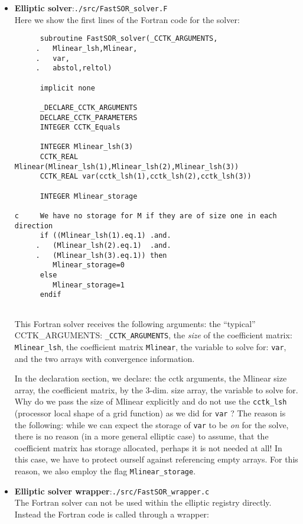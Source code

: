 \documentclass{article}
\begin{document}
\begin{itemize}
\item{\bf Elliptic solver}:{\tt ./src/FastSOR\_solver.F}\\
Here we show the first lines of the Fortran code for the solver:

\begin{verbatim}
      subroutine FastSOR_solver(_CCTK_ARGUMENTS,
     .   Mlinear_lsh,Mlinear, 
     .   var,
     .   abstol,reltol)

      implicit none

      _DECLARE_CCTK_ARGUMENTS
      DECLARE_CCTK_PARAMETERS
      INTEGER CCTK_Equals

      INTEGER Mlinear_lsh(3)
      CCTK_REAL Mlinear(Mlinear_lsh(1),Mlinear_lsh(2),Mlinear_lsh(3))
      CCTK_REAL var(cctk_lsh(1),cctk_lsh(2),cctk_lsh(3))
	
      INTEGER Mlinear_storage

c     We have no storage for M if they are of size one in each direction
      if ((Mlinear_lsh(1).eq.1) .and. 
     .   (Mlinear_lsh(2).eq.1)  .and.
     .   (Mlinear_lsh(3).eq.1)) then
         Mlinear_storage=0
      else
         Mlinear_storage=1
      endif


\end{verbatim}
This Fortran solver receives the following arguments: the ``typical''
 CCTK\_ARGUMENTS: {\tt \_CCTK\_ARGUMENTS},
the {\em size} of the coefficient matrix: {\tt Mlinear\_lsh}, the coefficient
matrix {\tt Mlinear}, the variable to solve for: {\tt var}, and the two arrays with convergence information. 

In the declaration section, we declare: the cctk arguments, the Mlinear size array, the coefficient matrix, by the 3-dim. size array, the variable to solve for. Why do we pass the size of Mlinear explicitly and do not use the 
{\tt cctk\_lsh} (processor local shape of a grid function) as we did for {\tt var} ? The reason is the following: while we can expect the storage of {\tt var} to be {\em on} for the solve, there is no reason (in a more general elliptic case) to assume, that the coefficient 
matrix has storage allocated, perhaps it is not needed at all! In this case, we have to protect ourself against referencing empty arrays. For this reason, we also employ the flag {\tt Mlinear\_storage}.

\item{\bf Elliptic solver wrapper}:{\tt ./src/FastSOR\_wrapper.c}\\
The Fortran solver can not be used within the elliptic registry directly. 
Instead the Fortran code is called through a wrapper:
\begin{verbatim}


\end{verbatim}
\end{itemize}
\end{document}
